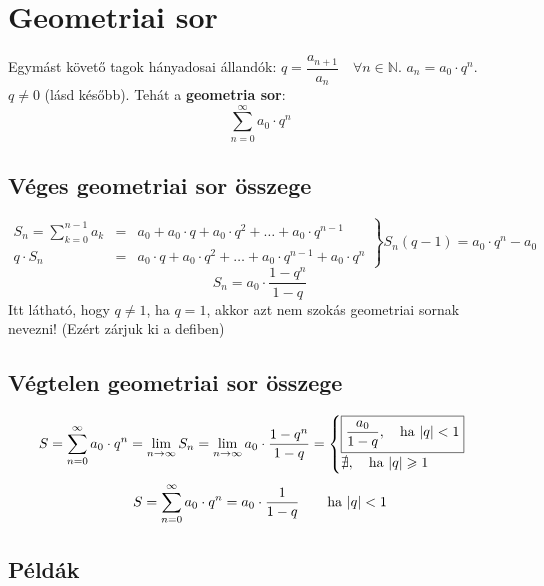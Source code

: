 \documentclass[a4paper,12pt,twoside]{book}
\theoremstyle{break}
\theoremstyle{plain}
\begin{document}
\section{Geometriai sor}

Egymást követő tagok hányadosai állandók: $q = \dfrac{a_{n+1}}{a_n} \quad \forall n\in\mathbb{N}$. $a_n = a_0\cdot q^n$. $q\neq 0$ (lásd később). Tehát a \textbf{geometria sor}:
\[\boxed{\sum^\infty_{n=0} a_0\cdot q^n}\]

\subsection{Véges geometriai sor összege}

\[\left.\begin{array}{rcl}
  \displaystyle S_n = \sum^{n-1}_{k=0} a_k & = & a_0 + a_0\cdot q + a_0\cdot q^2 + \ldots + a_0\cdot q^{n-1} \\
  \displaystyle q\cdot S_n & = & a_0\cdot q + a_0\cdot q^2 + \ldots + a_0\cdot q^{n-1}+ a_0\cdot q^{n}
\end{array}\right\}S_n(q-1)=a_0\cdot q^{n}-a_0\]
\[\boxed{S_n = a_0 \cdot \frac{1-q^n}{1-q}}\]
Itt látható, hogy $q\neq 1$, ha $q=1$, akkor azt nem szokás geometriai sornak nevezni! (Ezért zárjuk ki a defiben)

\subsection{Végtelen geometriai sor összege}

\[S=\sum^\infty_{n=0} a_0\cdot q^n = \lim_{n\to\infty} S_n = \lim_{n\to\infty} a_0\cdot\frac{1-q^n}{1-q} = \begin{cases}
  \boxed{\dfrac{a_0}{1-q}, \quad \hbox{ha $|q|<1$}}\\
  \nexists, \quad \hbox{ha $|q|\geqslant 1$}
\end{cases}\]
\[S=\sum^\infty_{n=0} a_0\cdot q^n=a_0\cdot\frac{1}{1-q} \qquad \hbox{ha $|q|<1$}\]

\subsection{Példák}
\end{document}
